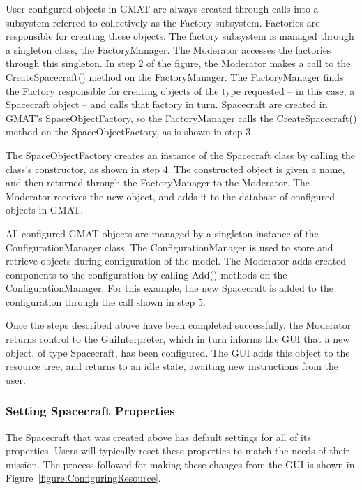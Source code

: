 User configured objects in GMAT are always created through calls into a subsystem referred to
collectively as the Factory subsystem.  Factories are responsible for creating these objects.  The
factory subsystem is managed through a singleton class, the FactoryManager.  The Moderator accesses
the factories through this singleton.  In step 2 of the figure, the Moderator makes a call to the
CreateSpacecraft() method on the FactoryManager.  The FactoryManager finds the Factory responsible
for creating objects of the type requested -- in this case, a Spacecraft object -- and calls that
factory in turn.  Spacecraft are created in GMAT's SpaceObjectFactory, so the FactoryManager calls
the CreateSpacecraft() method on the SpaceObjectFactory, as is shown in step 3.

The SpaceObjectFactory creates an instance of the Spacecraft class by calling the class's
constructor, as shown in step 4.  The constructed object is given a name, and then returned
through the FactoryManager to the Moderator.  The Moderator receives the new object, and adds it to
the database of configured objects in GMAT.

All configured GMAT objects are managed by a singleton instance of the ConfigurationManager class.
The ConfigurationManager is used to store and retrieve objects during configuration of the model.
The Moderator adds created components to the configuration by calling Add() methods on the
ConfigurationManager.  For this example, the new Spacecraft is added to the configuration through
the call shown in step 5.

Once the steps described above have been completed successfully, the Moderator returns control to
the GuiInterpreter, which in turn informs the GUI that a new object, of type Spacecraft, has been
configured.  The GUI adds this object to the resource tree, and returns to an idle state, awaiting
new instructions from the user.

\subsubsection{\label{section:ObjectConfiguration}Setting Spacecraft Properties}

The Spacecraft that was created above has default settings for all of its properties.  Users will
typically reset these properties to match the needs of their mission.  The process followed for
making these changes from the GUI is shown in Figure~\ref{figure:ConfiguringResource}.

